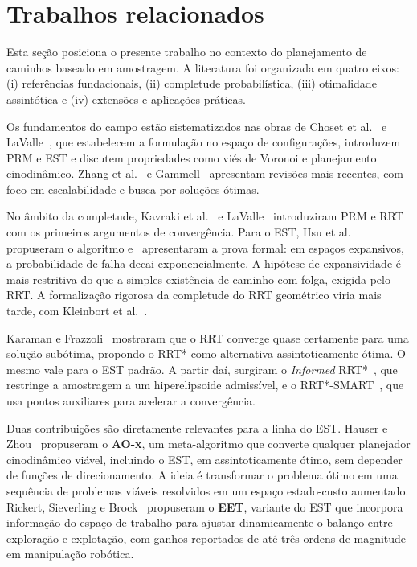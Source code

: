 \section{Trabalhos relacionados}
\label{sec:trabalhos_relacionados}

Esta seção posiciona o presente trabalho no contexto do planejamento de caminhos baseado em amostragem. A literatura foi organizada em quatro eixos: (i) referências fundacionais, (ii) completude probabilística, (iii) otimalidade assintótica e (iv) extensões e aplicações práticas.

Os fundamentos do campo estão sistematizados nas obras de Choset et al.~\cite{choset2005principles} e LaValle~\cite{lavalle2006planning}, que estabelecem a formulação no espaço de configurações, introduzem PRM e EST e discutem propriedades como viés de Voronoi e planejamento cinodinâmico. Zhang et al.~\cite{Zhang_2025} e Gammell~\cite{gammell2021asymptotically} apresentam revisões mais recentes, com foco em escalabilidade e busca por soluções ótimas.

No âmbito da completude, Kavraki et al.~\cite{kavraki1996probabilistic} e LaValle~\cite{LaValle1998RapidlyexploringRT} introduziram PRM e RRT com os primeiros argumentos de convergência. Para o EST, Hsu et al.~\cite{hsu1997path} propuseram o algoritmo e~\cite{hsu1999path} apresentaram a prova formal: em espaços expansivos, a probabilidade de falha decai exponencialmente. A hipótese de expansividade é mais restritiva do que a simples existência de caminho com folga, exigida pelo RRT. A formalização rigorosa da completude do RRT geométrico viria mais tarde, com Kleinbort et al.~\cite{kleinbort2022probabilisticcompletenessrrtgeometric}.

Karaman e Frazzoli~\cite{Karaman2011SamplingbasedAF} mostraram que o RRT converge quase certamente para uma solução subótima, propondo o RRT* como alternativa assintoticamente ótima. O mesmo vale para o EST padrão. A partir daí, surgiram o \textit{Informed} RRT*~\cite{6942976}, que restringe a amostragem a um hiperelipsoide admissível, e o RRT*-SMART~\cite{nasir2013rrtsmart}, que usa pontos auxiliares para acelerar a convergência.

Duas contribuições são diretamente relevantes para a linha do EST. Hauser e Zhou~\cite{hauser2016asymptotically} propuseram o \textbf{AO-x}, um meta-algoritmo que converte qualquer planejador cinodinâmico viável, incluindo o EST, em assintoticamente ótimo, sem depender de funções de direcionamento. A ideia é transformar o problema ótimo em uma sequência de problemas viáveis resolvidos em um espaço estado-custo aumentado. Rickert, Sieverling e Brock~\cite{rickert2014balancing} propuseram o \textbf{EET}, variante do EST que incorpora informação do espaço de trabalho para ajustar dinamicamente o balanço entre exploração e explotação, com ganhos reportados de até três ordens de magnitude em manipulação robótica.

